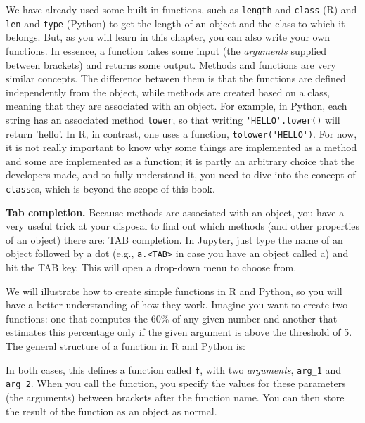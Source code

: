 We have already used some built-in functions, such as \texttt{length} and
\texttt{class} (R) and \texttt{len} and \texttt{type} (Python) to get the length
of an object and the class to which it belongs. But, as you will learn
in this chapter, you can also write your own functions. In essence, a
function takes some input (the \emph{arguments} supplied between
brackets) and returns some output.  Methods and functions are very
similar concepts. The difference between them is that the functions
are defined independently from the object, while methods are created
based on a class, meaning that they are associated with an object. For
example, in Python, each string has an associated method \texttt{lower},
so that writing \verb|'HELLO'.lower()| will return 'hello'. In R, in
contrast, one uses a function, \verb|tolower('HELLO')|. For now, it is not
really important to know why some things are implemented as a method
and some are implemented as a function; it is partly an arbitrary
choice that the developers made, and to fully understand it, you need
to dive into the concept of \texttt{class}es, which is beyond the scope of
this book.


\begin{feature}\textbf{Tab completion.} Because methods are associated with an object, you have a very
  useful trick at your disposal to find out which methods (and other
  properties of an object) there are: TAB completion. In Jupyter, just
  type the name of an object followed by a dot (e.g., \texttt{a.<TAB>} in case you
  have an object called a) and hit the TAB key. This will open a
  drop-down menu to choose from.
\end{feature}

We will illustrate how to create simple functions in R and Python, so you
will have a better understanding of how they work. Imagine you want to
create two functions: one that computes the 60\% of any given number
and another that estimates this percentage only if the given argument
is above the threshold of 5.
The general structure of a function in R and Python is:


In both cases, this defines a function called \verb|f|,
with two \emph{arguments}, \verb|arg_1| and \verb|arg_2|.
When you call the function, you specify the values for these parameters (the arguments) between brackets after the function name.
You can then store the result of the function as an object as normal.

